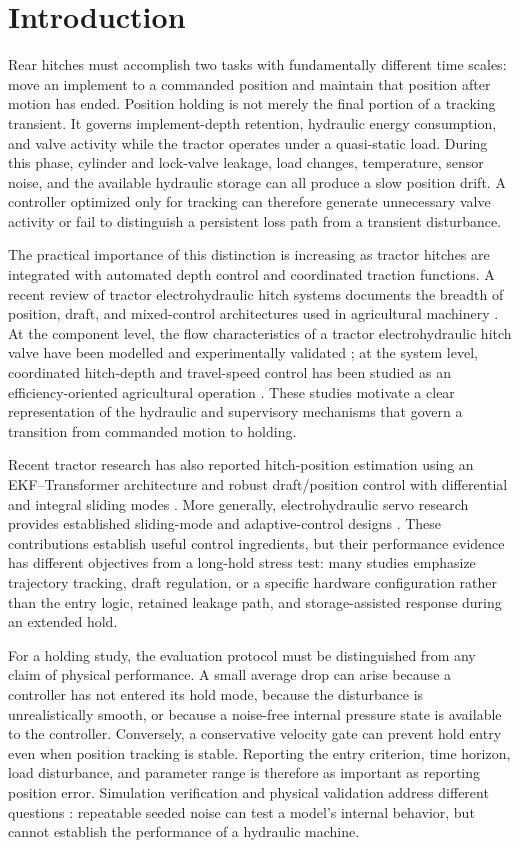 \documentclass[machines,article,submit,pdftex,moreauthors]{Definitions/mdpi}
\begin{document}
\section{Introduction}
Rear hitches must accomplish two tasks with fundamentally different time scales: move an implement to a commanded position and maintain that position after motion has ended. Position holding is not merely the final portion of a tracking transient. It governs implement-depth retention, hydraulic energy consumption, and valve activity while the tractor operates under a quasi-static load. During this phase, cylinder and lock-valve leakage, load changes, temperature, sensor noise, and the available hydraulic storage can all produce a slow position drift. A controller optimized only for tracking can therefore generate unnecessary valve activity or fail to distinguish a persistent loss path from a transient disturbance.

The practical importance of this distinction is increasing as tractor hitches are integrated with automated depth control and coordinated traction functions. A recent review of tractor electrohydraulic hitch systems documents the breadth of position, draft, and mixed-control architectures used in agricultural machinery \cite{sun2022}. At the component level, the flow characteristics of a tractor electrohydraulic hitch valve have been modelled and experimentally validated \cite{kumar2021}; at the system level, coordinated hitch-depth and travel-speed control has been studied as an efficiency-oriented agricultural operation \cite{sun2025}. These studies motivate a clear representation of the hydraulic and supervisory mechanisms that govern a transition from commanded motion to holding.

Recent tractor research has also reported hitch-position estimation using an EKF--Transformer architecture \cite{kim2025} and robust draft/position control with differential and integral sliding modes \cite{liu2023}. More generally, electrohydraulic servo research provides established sliding-mode and adaptive-control designs \cite{bai2010,tang2011,jin2013}. These contributions establish useful control ingredients, but their performance evidence has different objectives from a long-hold stress test: many studies emphasize trajectory tracking, draft regulation, or a specific hardware configuration rather than the entry logic, retained leakage path, and storage-assisted response during an extended hold.

For a holding study, the evaluation protocol must be distinguished from any claim of physical performance. A small average drop can arise because a controller has not entered its hold mode, because the disturbance is unrealistically smooth, or because a noise-free internal pressure state is available to the controller. Conversely, a conservative velocity gate can prevent hold entry even when position tracking is stable. Reporting the entry criterion, time horizon, load disturbance, and parameter range is therefore as important as reporting position error. Simulation verification and physical validation address different questions \cite{sargent2013}: repeatable seeded noise can test a model's internal behavior, but cannot establish the performance of a hydraulic machine.
\end{document}
